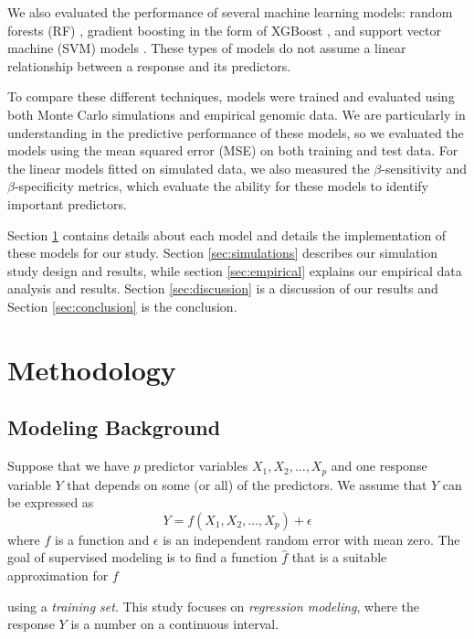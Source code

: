\documentclass{article}
\begin{document}
	We also evaluated the performance of several machine learning models: random forests (RF) \cite{breiman2001random}, gradient boosting in the form of XGBoost \cite{chen2021xgboost}, and support vector machine (SVM) models \cite{cortes1995support}. These types of models do not assume a linear relationship between a response and its predictors.
	
	To compare these different techniques, models were trained and evaluated using both Monte Carlo simulations and empirical genomic data. We are particularly in understanding in the predictive performance of these models, so we evaluated the models using the mean squared error (MSE) on both training and test data. For the linear models fitted on simulated data, we also measured the $\beta$-sensitivity and $\beta$-specificity metrics, which evaluate the ability for these models to identify important predictors.
	
	Section \ref{sec:methodology} contains details about each model and details the implementation of these models for our study. Section \ref{sec:simulations} describes our simulation study design and results, while section \ref{sec:empirical} explains our empirical data analysis and results. Section \ref{sec:discussion} is a discussion of our results and Section \ref{sec:conclusion} is the conclusion.
	
	\section{Methodology}\label{sec:methodology}
	\subsection{Modeling Background}
	
	Suppose that we have $p$ predictor variables $X_1, X_2, \dotsc, X_p$ and one response variable $Y$ that depends on some (or all) of the predictors. We assume that $Y$ can be expressed as
	\begin{equation}\label{eqn:relationship}
		Y = f(X_1, X_2, \dotsc, X_p) + \epsilon
	\end{equation}
	where $f$ is a function and $\epsilon$ is an independent random error with mean zero. The goal of supervised modeling is to find a function $\hat{f}$ that is a suitable approximation for $f$ 

	using a \textit{training set}. This study focuses on \textit{regression modeling}, where the response $Y$ is a number on a continuous interval.
	
\end{document}
